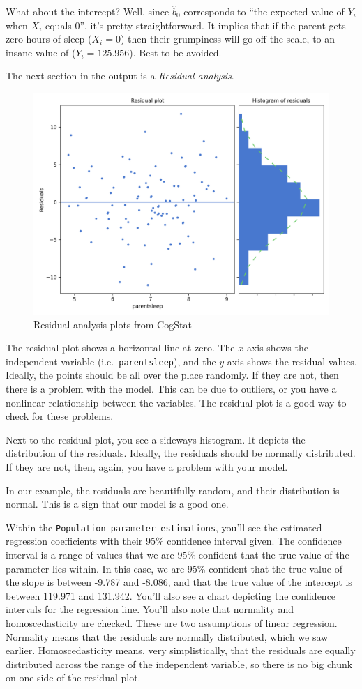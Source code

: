 \documentclass[
  11pt,
  a4paper,
  twoside,symmetric,openright]{book}
\theoremstyle{break}
\theoremstyle{break}
\begin{document}
What about the intercept? Well, since \(\hat{b}_0\) corresponds to ``the expected value of \(Y_i\) when \(X_i\) equals 0'', it's pretty straightforward. It implies that if the parent gets zero hours of sleep (\(X_i =0\)) then their grumpiness will go off the scale, to an insane value of (\(Y_i = 125.956\)). Best to be avoided.

The next section in the output is a \emph{Residual analysis}.

\begin{figure}

{\centering \includegraphics[width=0.6\linewidth]{resources/image/parentresidualanalysis} 

}

\caption{Residual analysis plots from CogStat}\label{fig:residualanalysisplot}
\end{figure}

The residual plot shows a horizontal line at zero. The \(x\) axis shows the independent variable (i.e.~\texttt{parentsleep}), and the \(y\) axis shows the residual values. Ideally, the points should be all over the place randomly. If they are not, then there is a problem with the model. This can be due to outliers, or you have a nonlinear relationship between the variables. The residual plot is a good way to check for these problems.

Next to the residual plot, you see a sideways histogram. It depicts the distribution of the residuals. Ideally, the residuals should be normally distributed. If they are not, then, again, you have a problem with your model.

In our example, the residuals are beautifully random, and their distribution is normal. This is a sign that our model is a good one.

Within the \texttt{Population\ parameter\ estimations}, you'll see the estimated regression coefficients with their 95\% confidence interval given. The confidence interval is a range of values that we are 95\% confident that the true value of the parameter lies within. In this case, we are 95\% confident that the true value of the slope is between -9.787 and -8.086, and that the true value of the intercept is between 119.971 and 131.942. You'll also see a chart depicting the confidence intervals for the regression line. You'll also note that normality and homoscedasticity are checked. These are two assumptions of linear regression. Normality means that the residuals are normally distributed, which we saw earlier. Homoscedasticity means, very simplistically, that the residuals are equally distributed across the range of the independent variable, so there is no big chunk on one side of the residual plot.
\end{document}

